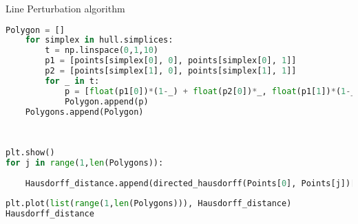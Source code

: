 \documentclass{article}
\begin{document}
\begin{codeblock}{Line Perturbation algorithm}
\begin{lstlisting}[language=Python]
    Polygon = []
    for simplex in hull.simplices:
        t = np.linspace(0,1,10)
        p1 = [points[simplex[0], 0], points[simplex[0], 1]]
        p2 = [points[simplex[1], 0], points[simplex[1], 1]]
        for _ in t:
            p = [float(p1[0])*(1-_) + float(p2[0])*_, float(p1[1])*(1-_) + float(p2[1])*_]
            Polygon.append(p)
    Polygons.append(Polygon)
        
        
    
plt.show()
for j in range(1,len(Polygons)):
    
    Hausdorff_distance.append(directed_hausdorff(Points[0], Points[j])[0])
    
plt.plot(list(range(1,len(Polygons))), Hausdorff_distance)
Hausdorff_distance
\end{lstlisting}
    
\end{codeblock}
\end{document}
